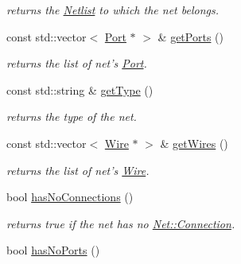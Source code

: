 \begin{DoxyCompactItemize}
\begin{DoxyCompactList}\small\item\em returns the \hyperlink{class_open_chams_1_1_netlist}{Netlist} to which the net belongs. \end{DoxyCompactList}\item 
\hypertarget{class_open_chams_1_1_net_ae9d241ec6dd833b6d7813e14ff2d9eca}{const std\-::vector$<$ \hyperlink{class_open_chams_1_1_port}{Port} $\ast$ $>$ \& \hyperlink{class_open_chams_1_1_net_ae9d241ec6dd833b6d7813e14ff2d9eca}{get\-Ports} ()}\label{class_open_chams_1_1_net_ae9d241ec6dd833b6d7813e14ff2d9eca}

\begin{DoxyCompactList}\small\item\em returns the list of net's \hyperlink{class_open_chams_1_1_port}{Port}. \end{DoxyCompactList}\item 
\hypertarget{class_open_chams_1_1_net_a7a88ff26f0ba9cfbfa5059c565d1e30b}{const std\-::string \& \hyperlink{class_open_chams_1_1_net_a7a88ff26f0ba9cfbfa5059c565d1e30b}{get\-Type} ()}\label{class_open_chams_1_1_net_a7a88ff26f0ba9cfbfa5059c565d1e30b}

\begin{DoxyCompactList}\small\item\em returns the type of the net. \end{DoxyCompactList}\item 
\hypertarget{class_open_chams_1_1_net_a2f8bcf7cad7711850efeca408f146b8a}{const std\-::vector$<$ \hyperlink{class_open_chams_1_1_wire}{Wire} $\ast$ $>$ \& \hyperlink{class_open_chams_1_1_net_a2f8bcf7cad7711850efeca408f146b8a}{get\-Wires} ()}\label{class_open_chams_1_1_net_a2f8bcf7cad7711850efeca408f146b8a}

\begin{DoxyCompactList}\small\item\em returns the list of net's \hyperlink{class_open_chams_1_1_wire}{Wire}. \end{DoxyCompactList}\item 
\hypertarget{class_open_chams_1_1_net_ac4a660a2f87ab816f6e8b5ae2c2142f9}{bool \hyperlink{class_open_chams_1_1_net_ac4a660a2f87ab816f6e8b5ae2c2142f9}{has\-No\-Connections} ()}\label{class_open_chams_1_1_net_ac4a660a2f87ab816f6e8b5ae2c2142f9}

\begin{DoxyCompactList}\small\item\em returns true if the net has no \hyperlink{class_open_chams_1_1_net_1_1_connection}{Net\-::\-Connection}. \end{DoxyCompactList}\item 
\hypertarget{class_open_chams_1_1_net_a3eef7a6d1e945441f197f0918ab8895e}{bool \hyperlink{class_open_chams_1_1_net_a3eef7a6d1e945441f197f0918ab8895e}{has\-No\-Ports} ()}\label{class_open_chams_1_1_net_a3eef7a6d1e945441f197f0918ab8895e}


\end{DoxyCompactItemize}
